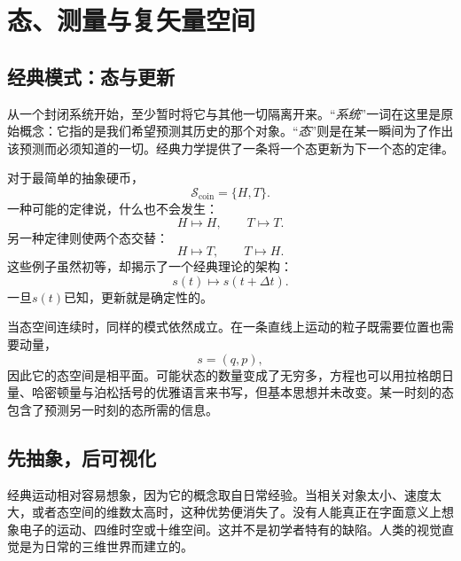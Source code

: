 \chapter{态、测量与复矢量空间}


\section{经典模式：态与更新}

从一个封闭系统开始，至少暂时将它与其他一切隔离开来。“\emph{系统}”一词在这里是原始概念：它指的是我们希望预测其历史的那个对象。“\emph{态}”则是在某一瞬间为了作出该预测而必须知道的一切。经典力学提供了一条将一个态更新为下一个态的定律。

对于最简单的抽象硬币，
\begin{equation}
  \mathcal S_{\mathrm{coin}}=\{H,T\}.
\end{equation}
一种可能的定律说，什么也不会发生：
\begin{equation}
  H\longmapsto H,
  \qquad
  T\longmapsto T.
\end{equation}
另一种定律则使两个态交替：
\begin{equation}
  H\longmapsto T,
  \qquad
  T\longmapsto H.
\end{equation}
这些例子虽然初等，却揭示了一个经典理论的架构：
\begin{equation}
  s(t)\longmapsto s(t+\Delta t).
\end{equation}
一旦\(s(t)\)已知，更新就是确定性的。

当态空间连续时，同样的模式依然成立。在一条直线上运动的粒子既需要位置也需要动量，
\begin{equation}
  s=(q,p),
\end{equation}
因此它的态空间是相平面。可能状态的数量变成了无穷多，方程也可以用拉格朗日量、哈密顿量与泊松括号的优雅语言来书写，但基本思想并未改变。某一时刻的态包含了预测另一时刻的态所需的信息。

\section{先抽象，后可视化}

经典运动相对容易想象，因为它的概念取自日常经验。当相关对象太小、速度太大，或者态空间的维数太高时，这种优势便消失了。没有人能真正在字面意义上想象电子的运动、四维时空或十维空间。这并不是初学者特有的缺陷。人类的视觉直觉是为日常的三维世界而建立的。

